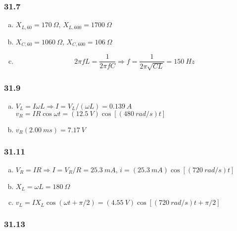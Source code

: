 \documentclass{article}
\begin{document}
\subsubsection{31.7}

\begin{enumerate}[(a)]
  \item $X_{L,60} = \qty{170}{\Omega}$, $X_{L,600} = \qty{1700}{\Omega}$

  \item $X_{C,60} = \qty{1060}{\Omega}$, $X_{C,600} = \qty{106}{\Omega}$

  \item \[2 \pi f L = \frac{1}{2 \pi f C} \Rightarrow f = \frac{1}{2 \pi \sqrt{C L}} = \qty{150}{Hz}\]
\end{enumerate}

\subsubsection{31.9}

\begin{enumerate}[(a)]
  \item $V_L = I \omega L \Rightarrow I = V_L / (\omega L) = \qty{0.139}{A}$ \\ $v_R = I R \cos \omega t = (\qty{12.5}{V}) \cos [(\qty{480}{rad/s}) t]$

  \item $v_R(\qty{2.00}{ms}) = \qty{7.17}{V}$
\end{enumerate}

\subsubsection{31.11}

\begin{enumerate}[(a)]
  \item $V_R = I R \Rightarrow I = V_R / R = \qty{25.3}{mA}$, $i = (\qty{25.3}{mA}) \cos [(\qty{720}{rad/s}) t]$

  \item $X_L = \omega L = \qty{180}{\Omega}$

  \item $v_L = I X_L \cos (\omega t + \pi / 2) = (\qty{4.55}{V}) \cos [(\qty{720}{rad/s}) t + \pi / 2]$
\end{enumerate}

\subsubsection{31.13}
\end{document}
